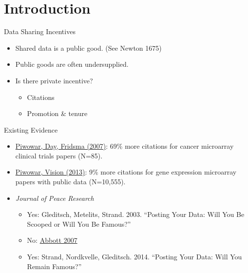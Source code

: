 \documentclass{beamer}
\begin{document}


\section{Introduction}

\begin{frame}{Data Sharing Incentives}{}

  \begin{itemize}
  \item
    Shared data is a public good. (See Newton 1675)
  \item
    Public goods are often undersupplied.
  \item 
  	 Is there private incentive?
  	 \begin{itemize}
  	 \item Citations
  	 \item Promotion \& tenure
  	 \end{itemize} 
  \end{itemize}
\end{frame}

\begin{frame}{Existing Evidence}
\begin{itemize}
\item \href{http://journals.plos.org/plosone/article?id=10.1371/journal.pone.0000308}{Piwowar, Day, Fridsma (2007)}: 69\% more citations for cancer microarray clinical trials papers (N=85).
\item \href{https://peerj.com/articles/175/}{Piwowar, Vision (2013)}: 9\% more citations for gene expression microarray papers with public data (N=10,555).
\item \textit{Journal of Peace Research}
\begin{itemize}
\item
Yes: Gleditsch, Metelits, Strand. 2003. ``Posting Your Data: Will You Be Scooped or Will You Be Famous?''
\item No: \href{http://journals.sagepub.com/doi/abs/10.1177/0049124107306664}{Abbott 2007}
\item Yes: Strand, Nordkvelle, Gleditsch. 2014. ``Posting Your Data: Will You Remain Famous?''

\end{itemize}
\end{itemize}
\end{frame}
\end{document}
